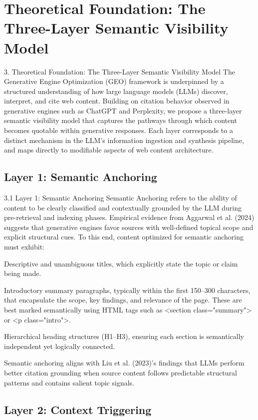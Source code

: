\section{Theoretical Foundation: The Three-Layer Semantic Visibility Model}

3. Theoretical Foundation: The Three-Layer Semantic Visibility Model
The Generative Engine Optimization (GEO) framework is underpinned by a structured understanding of how large language models (LLMs) discover, interpret, and cite web content. Building on citation behavior observed in generative engines such as ChatGPT and Perplexity, we propose a three-layer semantic visibility model that captures the pathways through which content becomes quotable within generative responses. Each layer corresponds to a distinct mechanism in the LLM's information ingestion and synthesis pipeline, and maps directly to modifiable aspects of web content architecture.
\subsection{Layer 1: Semantic Anchoring}

3.1 Layer 1: Semantic Anchoring
Semantic Anchoring refers to the ability of content to be clearly classified and contextually grounded by the LLM during pre-retrieval and indexing phases. Empirical evidence from Aggarwal et al. (2024) suggests that generative engines favor sources with well-defined topical scope and explicit structural cues. To this end, content optimized for semantic anchoring must exhibit:

Descriptive and unambiguous titles, which explicitly state the topic or claim being made.

Introductory summary paragraphs, typically within the first 150–300 characters, that encapsulate the scope, key findings, and relevance of the page. These are best marked semantically using HTML tags such as <section class="summary"> or <p class="intro">.

Hierarchical heading structures (H1–H3), ensuring each section is semantically independent yet logically connected.

Semantic anchoring aligns with Liu et al. (2023)’s findings that LLMs perform better citation grounding when source content follows predictable structural patterns and contains salient topic signals.
\subsection{Layer 2: Context Triggering}

